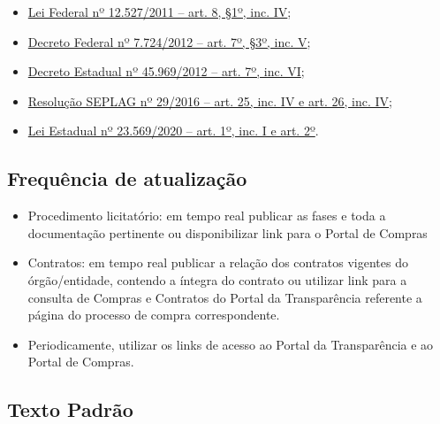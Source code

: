 \documentclass[
]{book}
\providecommand{\tightlist}{%
  \setlength{\itemsep}{0pt}\setlength{\parskip}{0pt}}
\begin{document}
\begin{itemize}
\tightlist
\item
  \href{http://www.planalto.gov.br/ccivil_03/_ato2011-2014/2011/lei/l12527.htm\#art8}{Lei Federal nº 12.527/2011 -- art. 8, §1º, inc. IV};
\item
  \href{http://www.planalto.gov.br/ccivil_03/_ato2011-2014/2012/decreto/d7724.htm\#art7}{Decreto Federal nº 7.724/2012 -- art. 7º, §3º, inc. V};
\item
  \href{https://www.almg.gov.br/consulte/legislacao/completa/completa.html?tipo=DEC\&num=45969\&ano=2012}{Decreto Estadual nº 45.969/2012 -- art. 7º, inc. VI};
\item
  \href{http://www.planejamento.mg.gov.br/sites/default/files/documentos/resolucao_sitios_seplag_29_de_05_07_2016_1.pdf}{Resolução SEPLAG nº 29/2016 -- art. 25, inc. IV e art. 26, inc. IV};
\item
  \href{https://www.almg.gov.br/consulte/legislacao/completa/completa.html?tipo=LEI\&num=23569\&comp=\&ano=2020}{Lei Estadual nº 23.569/2020 -- art. 1º, inc. I e art. 2º}.
\end{itemize}

\hypertarget{frequuxeancia-de-atualizauxe7uxe3o-5}{%
\subsection{Frequência de atualização}\label{frequuxeancia-de-atualizauxe7uxe3o-5}}

\begin{itemize}
\tightlist
\item
  Procedimento licitatório: em tempo real publicar as fases e toda a documentação pertinente ou disponibilizar link para o Portal de Compras
\item
  Contratos: em tempo real publicar a relação dos contratos vigentes do órgão/entidade, contendo a íntegra do contrato ou utilizar link para a consulta de Compras e Contratos do Portal da Transparência referente a página do processo de compra correspondente.
\item
  Periodicamente, utilizar os links de acesso ao Portal da Transparência e ao Portal de Compras.
\end{itemize}

\hypertarget{texto-padruxe3o-6}{%
\subsection{Texto Padrão}\label{texto-padruxe3o-6}}
\end{document}
